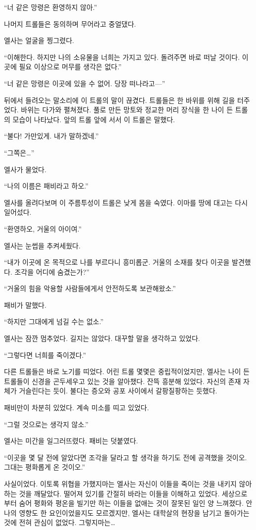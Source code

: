 ``너 같은 망령은 환영하지 않아.''

나머지 트롤들은 동의하며 무어라고 중얼댔다.

엘사는 얼굴을 찡그렸다.

``이해한다. 하지만 나의 소유물을 너희는 가지고 있다. 돌려주면 바로 떠날 것이다. 이곳에 필요 이상으로 머무를 생각은 없다.''

``너 같은 망령은 이곳에 있을 수 없어. 당장 떠나라고—''

뒤에서 들려오는 말소리에 이 트롤의 말이 끊겼다. 트롤들은 한 바위를 위해 길을 터주었다. 바위는 다가와 펼쳐졌다. 풀로 만든 망토와 정교한 머리 장식을 한 나이 든 트롤의 모습이 나타났다. 앞의 트롤 앞에 서서 이 트롤은 말했다.

``불다! 가만있게. 내가 말하겠네.''

``그쪽은\ldots''

엘사가 물었다.

``나의 이름은 패비라고 하오.''

엘사를 올려다보며 이 주름투성이 트롤은 낮게 몸을 숙였다. 이마를 땅에 대고는 다시 일어섰다.

``환영하오, 거울의 아이여.''

엘사는 눈썹을 추켜세웠다.

``내가 이곳에 온 목적으로 나를 부르다니 흥미롭군. 거울의 소재를 찾다 이곳을 발견했다. 조각을 어디에 숨겼는가?''

``거울의 힘을 악용할 사람들에게서 안전하도록 보관해왔소.''

패비가 말했다.

``하지만 그대에게 넘길 수는 없소.''

엘사는 잠깐 멈추었다. 길지는 않았다. 대꾸할 말을 생각하고 있었다.

``그렇다면 너희를 죽이겠다.''

다른 트롤들은 바로 노기를 띠었다. 어린 트롤 몇몇은 중립적이었지만, 엘사는 나이 든 트롤들이 신경을 곤두세우고 있는 것을 알아챘다. 잔뜩 흥분해 있었다. 자신의 존재 자체가 거슬린다는 듯이. 불다는 증오와 공포 사이에서 갈팡질팡하는 듯했다.

패비만이 차분히 있었다. 계속 미소를 띠고 있었다.

``그럴 것으로는 생각지 않소.''

엘사는 미간을 일그러뜨렸다. 패비는 덧붙였다.

``이곳을 몇 달 전에 알았다면 조각을 달라고 할 생각을 하기도 전에 공격했을 것이오. 그대는 평화롭게 온 것이오.''

사실이었다. 이토록 위협을 가했지마는 엘사는 자신이 이들을 죽이는 것을 내키지 않아 하는 것을 깨달았다. 떨어져 있기를 간절히 바라는 이들을 이해하고 있었다. 세상으로부터 숨어 평화와 평온을 빌기만 하는 이들을 없애는 것이 잘못된 일인 양 느껴졌다. 안나의 영향도 한 요인이었을지도 모르겠지만, 엘사는 대학살의 현장을 남기고 돌아가는 것에 전혀 관심이 없었다. 그렇지마는\ldots

